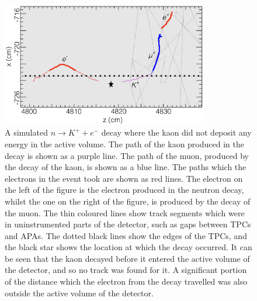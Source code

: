\begin{figure}[h!]
  \centering
  \includegraphics[width=0.8\textwidth]{MissedKaon}
  \caption[A simulated $n \rightarrow K^{+} + e^{-}$ decay where the kaon did not deposit any energy in the active volume]
          {A simulated $n \rightarrow K^{+} + e^{-}$ decay where the kaon did not deposit any energy in the active volume. The path of the kaon produced in the decay is shown as a purple line. The path of the muon, produced by the decay of the kaon, is shown as a blue line. The paths which the electrons in the event took are shown as red lines. The electron on the left of the figure is the electron produced in the neutron decay, whilst the one on the right of the figure, is produced by the decay of the muon. The thin coloured lines show track segments which were in uninstrumented parts of the detector, such as gaps between TPCs and APAs. The dotted black lines show the edges of the TPCs, and the black star shows the location at which the decay occurred. It can be seen that the kaon decayed before it entered the active volume of the detector, and so no track was found for it. A significant portion of the distance which the electron from the decay travelled was also outside the active volume of the detector.}
  \label{fig:NDK_Sig_MissedKaon}
\end{figure}


